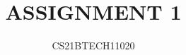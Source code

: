 \documentclass[journal,12pt,twocolumn]{IEEEtran}
\begin{document}
\makeatletter
{}
\makeatother
\let\StandardTheFigure\thefigure
\let\vec\mathbf
\renewcommand{\thefigure}{\theproblem}
\def\putbox#1#2#3{\makebox[0in][l]{\makebox[#1][l]{}\raisebox{\baselineskip}[0in][0in]{\raisebox{#2}[0in][0in]{#3}}}}
     \def\rightbox#1{\makebox[0in][r]{#1}}
     \def\centbox#1{\makebox[0in]{#1}}
     \def\topbox#1{\raisebox{-\baselineskip}[0in][0in]{#1}}
     \def\midbox#1{\raisebox{-0.5\baselineskip}[0in][0in]{#1}}
\vspace{3cm}
\title{
	ASSIGNMENT 1
}
\author{ CS21BTECH11020
}	


  \maketitle
  \bigskip
  \renewcommand{\thefigure}{\theenumi}
  \renewcommand{\thetable}{\theenumi}
\end{document}
